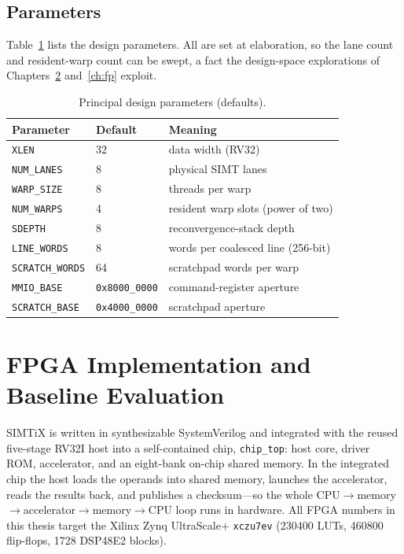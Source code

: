 \documentclass[12pt,a4paper,oneside]{report}
\newcommand{\code}[1]{\texttt{#1}}
\begin{document}
\section{Parameters}
Table~\ref{tab:params} lists the design parameters. All are set at elaboration, so
the lane count and resident-warp count can be swept, a fact the design-space
explorations of Chapters~\ref{ch:impl} and~\ref{ch:fp} exploit.

\begin{table}[t]
\caption{Principal design parameters (defaults).}
\label{tab:params}
\centering
\small
\begin{tabular}{lll}
\toprule
Parameter & Default & Meaning\\
\midrule
\code{XLEN} & 32 & data width (RV32)\\
\code{NUM\_LANES} & 8 & physical SIMT lanes\\
\code{WARP\_SIZE} & 8 & threads per warp\\
\code{NUM\_WARPS} & 4 & resident warp slots (power of two)\\
\code{SDEPTH} & 8 & reconvergence-stack depth\\
\code{LINE\_WORDS} & 8 & words per coalesced line (256-bit)\\
\code{SCRATCH\_WORDS} & 64 & scratchpad words per warp\\
\code{MMIO\_BASE} & \code{0x8000\_0000} & command-register aperture\\
\code{SCRATCH\_BASE} & \code{0x4000\_0000} & scratchpad aperture\\
\bottomrule
\end{tabular}
\end{table}

\chapter{FPGA Implementation and Baseline Evaluation}
\label{ch:impl}

SIMTiX is written in synthesizable SystemVerilog and integrated with the reused
five-stage RV32I host into a self-contained chip, \code{chip\_top}: host core,
driver ROM, accelerator, and an eight-bank on-chip shared memory. In the
integrated chip the host loads the operands into shared memory, launches the
accelerator, reads the results back, and publishes a checksum---so the whole
CPU$\rightarrow$memory$\rightarrow$accelerator$\rightarrow$memory$\rightarrow$CPU
loop runs in hardware. All FPGA numbers in this thesis target the Xilinx Zynq
UltraScale+ \code{xczu7ev} (\num{230400} LUTs, \num{460800} flip-flops, \num{1728}
DSP48E2 blocks).
\end{document}
